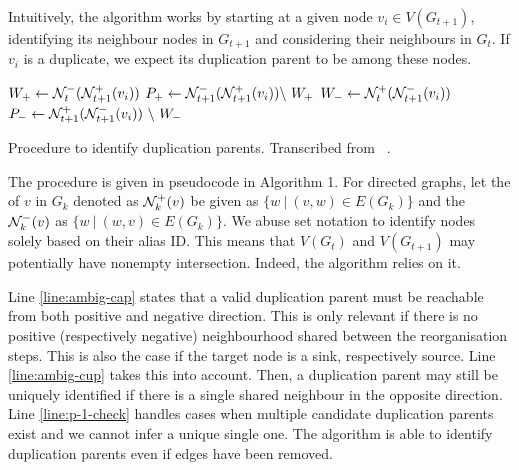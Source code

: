\documentclass[
	fontsize=10pt, %
	twoside=true, %
	secnumdepth=1, %
  toc=indentunnumbered %
]{kaobook}
\begin{document}
Intuitively, the algorithm works by starting at a given node $v_i \in
V(G_{t+1})$, identifying its neighbour nodes in $G_{t+1}$ and considering their
neighbours in $G_t$. If $v_i$ is a duplicate, we expect its duplication parent
to be among these nodes.

\begin{algorithm}[h]
  \DontPrintSemicolon
     $W_+ \gets \mathcal{N}_t^- ( \mathcal{N}_{t+1}^+(v_i) )$ \; $P_+ \gets
  \mathcal{N}_{t+1}^- ( \mathcal{N}_{t+1}^+(v_i) ) \backslash~ W_+$ \; $W_- \gets
  \mathcal{N}_t^+ ( \mathcal{N}_{t+1}^-(v_i) ) $ \; $P_- \gets \mathcal{N}_{t+1}^+ (
  \mathcal{N}_{t+1}^-(v_i) ) ~\backslash~ W_- $\;
    \label{alg:identify-duplicates}
    \caption{ Procedure to identify duplication parents. Transcribed from
      \citeauthor{nielsen_MachineLearningSupport_2019}~\cite{nielsen_MachineLearningSupport_2019}.
    }
\end{algorithm}

The procedure is given in pseudocode in Algorithm 1. For
directed graphs, let the  of $v$ in $G_k$ denoted as
$\mathcal{N}_k^+(v)$ be given as $\{w ~|~ (v,w) \in E(G_{k})\}$ and the  $\mathcal{N}_k^-(v)$ as $\{w ~|~ (w,v) \in E(G_k)\}$. We abuse set
notation to identify nodes solely based on their alias ID. This means that
$V(G_t)$ and $V(G_{t+1})$ may potentially have nonempty intersection. Indeed,
the algorithm relies on it.

Line \ref{line:ambig-cap} states that a valid duplication parent must be
reachable from both positive and negative direction. This is only relevant if
there is no positive (respectively negative) neighbourhood shared between the
reorganisation steps. This is also the case if the target node is a sink, 
respectively source. Line \ref{line:ambig-cup} takes this into account. Then, a
duplication parent may still be uniquely identified if there is a single shared
neighbour in the opposite direction.
Line \ref{line:p-1-check} handles cases when multiple candidate duplication
parents exist and we cannot infer a unique single one.
The algorithm is able to identify duplication parents even if edges have been
removed.
\end{document}
